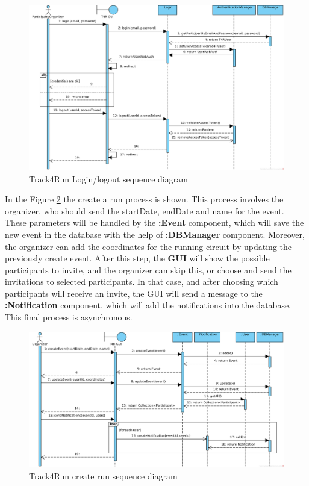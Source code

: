 \documentclass[a4paper, hidelinks, 12pt]{report}
\begin{document}
	\begin{figure}[H]
		\centering
		\includegraphics[width=1\textwidth]{diagrams/sequence_diagrams/t4r_login_logout.png}
		\caption[Track4Run Login/logout sequence diagram]{Track4Run Login/logout sequence diagram}
		\label{fig:t4r_seq_login}
	\end{figure}
	
	In the Figure \ref{fig:t4r_seq_create_run} the create a run process is shown. This process involves the organizer, who should send the startDate, endDate and name for the event. These parameters will be handled by the \textbf{:Event} component, which will save the new event in the database with the help of \textbf{:DBManager} component. Moreover, the organizer can add the coordinates for the running circuit by updating the previously create event. After this step, the \textbf{GUI} will show the possible participants to invite, and the organizer can skip this, or choose and send the invitations to selected participants. In that case, and after choosing which participants will receive an invite, the GUI will send a message to the \textbf{:Notification} component, which will add the notifications into the database. This final process is asynchronous.\\
	
	\begin{figure}[H]
		\centering
		\includegraphics[width=1\textwidth]{diagrams/sequence_diagrams/t4r_create_run.png}
		\caption[Track4Run create run sequence diagram]{Track4Run create run sequence diagram}
		\label{fig:t4r_seq_create_run}
	\end{figure}
	
\end{document}

